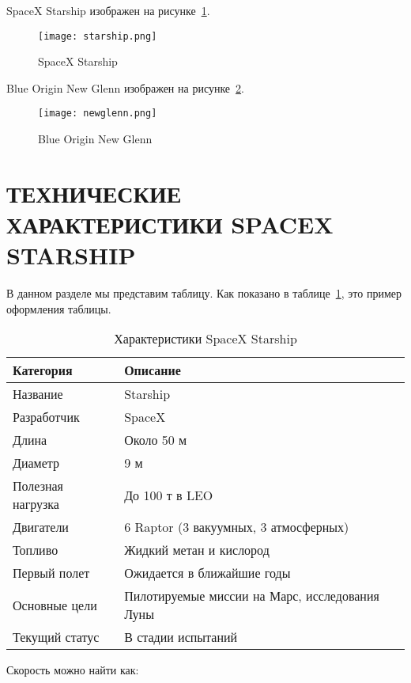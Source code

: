 \documentclass[14pt]{extarticle} %
\newcommand{\newsection}[1]{
    \clearpage
    \section{#1}
}
\begin{document}
SpaceX Starship изображен на рисунке~\ref{fig:starship}.
\begin{figure}[h]
    \centering
    \texttt{[image: starship.png]}
    \caption{SpaceX Starship}
    \label{fig:starship}
\end{figure}

Blue Origin New Glenn изображен на рисунке~\ref{fig:newglenn}.
\begin{figure}[h]
    \centering
    \texttt{[image: newglenn.png]}
    \caption{Blue Origin New Glenn}
    \label{fig:newglenn}
\end{figure}

\newsection{ТЕХНИЧЕСКИЕ ХАРАКТЕРИСТИКИ SPACEX STARSHIP}
В данном разделе мы представим таблицу. Как показано в таблице~\ref{tab:starship}, это пример оформления таблицы.

\begin{table}[h]
\centering %
\captionsetup{justification=raggedright, singlelinecheck=false}
\caption{Характеристики SpaceX Starship} %
\label{tab:starship}
\begin{tabular}{|l|l|}
\hline
\textbf{Категория} & \textbf{Описание}                              \\ \hline
Название           & Starship                                       \\ \hline
Разработчик        & SpaceX                                         \\ \hline
Длина              & Около 50 м                                     \\ \hline
Диаметр            & 9 м                                            \\ \hline
Полезная нагрузка  & До 100 т в LEO                                 \\ \hline
Двигатели          & 6 Raptor (3 вакуумных, 3 атмосферных)          \\ \hline
Топливо            & Жидкий метан и кислород                        \\ \hline
Первый полет       & Ожидается в ближайшие годы                     \\ \hline
Основные цели      & Пилотируемые миссии на Марс, исследования Луны \\ \hline
Текущий статус     & В стадии испытаний                             \\ \hline
\end{tabular}
\end{table}
Скорость можно найти как:
\end{document}
